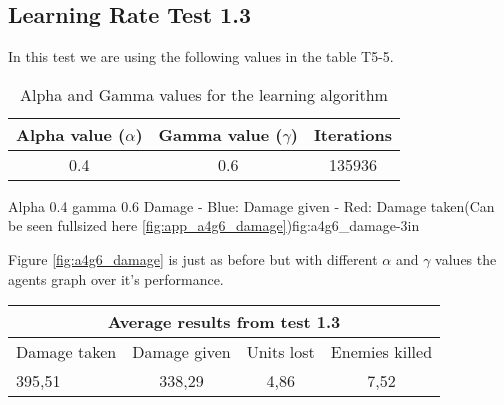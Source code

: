 
\subsection*{Learning Rate Test 1.3}
In this test we are using the following values in the table T5-5.


\begin{table}[H]
\begin{centering}
 \begin{tabular}{|c|c|c|}
	\hline
		Alpha value ($\alpha$) & Gamma value ($\gamma$) & Iterations\\
	\hline
		0.4 & 0.6 & 135936 \\
	\hline
\end{tabular}
\label{a4g6_table}
\caption{Alpha and Gamma values for the learning algorithm}

\end{centering}
\end{table}

			{Alpha 0.4 gamma 0.6 Damage - Blue: Damage given - Red: Damage taken(Can be seen fullsized here \ref{fig:app_a4g6_damage})}{fig:a4g6_damage}{-3in}

Figure \ref{fig:a4g6_damage} is just as before but with different $\alpha$ and $\gamma$ values the agents graph over it's performance.




\begin{table}
\begin{centering}

 \begin{tabular}{|l|c|c|c|}
	\multicolumn{4}{c}{Average results from test 1.3} \\
	\hline
		Damage taken & Damage given & Units lost & Enemies killed\\
	\hline
		395,51 & 338,29 & 4,86 & 7,52 \\
	\hline
\end{tabular}
\label{test1.3}
\end{centering}
\end{table}
\newpage


